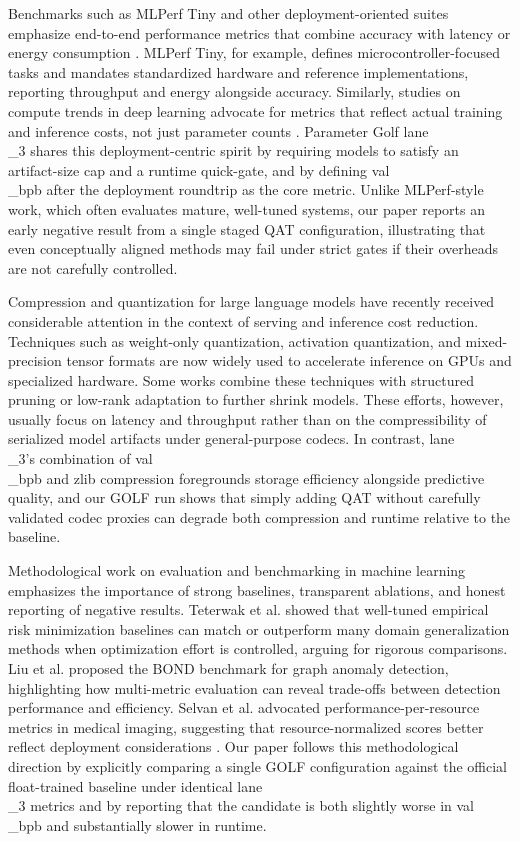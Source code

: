 \documentclass{article}
\begin{document}
Benchmarks such as MLPerf Tiny and other deployment-oriented suites emphasize end-to-end performance metrics that combine accuracy with latency or energy consumption \cite{banbury2021mlperf}. MLPerf Tiny, for example, defines microcontroller-focused tasks and mandates standardized hardware and reference implementations, reporting throughput and energy alongside accuracy. Similarly, studies on compute trends in deep learning advocate for metrics that reflect actual training and inference costs, not just parameter counts \cite{desislavov2021compute}. Parameter Golf lane\\_3 shares this deployment-centric spirit by requiring models to satisfy an artifact-size cap and a runtime quick-gate, and by defining val\\_bpb after the deployment roundtrip as the core metric. Unlike MLPerf-style work, which often evaluates mature, well-tuned systems, our paper reports an early negative result from a single staged QAT configuration, illustrating that even conceptually aligned methods may fail under strict gates if their overheads are not carefully controlled.

Compression and quantization for large language models have recently received considerable attention in the context of serving and inference cost reduction. Techniques such as weight-only quantization, activation quantization, and mixed-precision tensor formats are now widely used to accelerate inference on GPUs and specialized hardware. Some works combine these techniques with structured pruning or low-rank adaptation to further shrink models. These efforts, however, usually focus on latency and throughput rather than on the compressibility of serialized model artifacts under general-purpose codecs. In contrast, lane\\_3's combination of val\\_bpb and zlib compression foregrounds storage efficiency alongside predictive quality, and our GOLF run shows that simply adding QAT without carefully validated codec proxies can degrade both compression and runtime relative to the baseline.

Methodological work on evaluation and benchmarking in machine learning emphasizes the importance of strong baselines, transparent ablations, and honest reporting of negative results. Teterwak et al. showed that well-tuned empirical risk minimization baselines can match or outperform many domain generalization methods when optimization effort is controlled, arguing for rigorous comparisons. Liu et al. proposed the BOND benchmark for graph anomaly detection, highlighting how multi-metric evaluation can reveal trade-offs between detection performance and efficiency. Selvan et al. advocated performance-per-resource metrics in medical imaging, suggesting that resource-normalized scores better reflect deployment considerations \cite{selvan2024pepr}. Our paper follows this methodological direction by explicitly comparing a single GOLF configuration against the official float-trained baseline under identical lane\\_3 metrics and by reporting that the candidate is both slightly worse in val\\_bpb and substantially slower in runtime.
\end{document}
